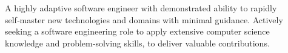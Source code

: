 

\begin{cvparagraph}

A highly adaptive software engineer with demonstrated ability to rapidly self‑master new technologies and domains with minimal guidance. Actively seeking a software engineering role to apply extensive computer science knowledge and problem‐solving skills, to deliver valuable contributions.

\end{cvparagraph}
